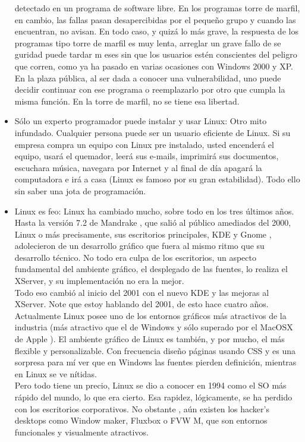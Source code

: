 \documentclass[11pt, a4paper]{report}
\begin{document}
\begin{itemize}
  detectado en un programa de software libre. En los programas torre de marfil,
  en cambio, las fallas pasan desapercibidas por el pequeño grupo y cuando las
  encuentran, no avisan. En todo caso, y quizá lo más grave, la respuesta de
  los programas tipo torre de marfil es muy lenta, arreglar un grave fallo de
  se guridad puede tardar m eses sin que los usuarios estén conscientes del
  peligro que corren, como ya ha pasado en varias ocasiones con Windows 2000 y
  XP. En la plaza pública, al ser dada a conocer una vulnerabilidad, uno puede
  decidir continuar con ese programa o reemplazarlo por otro que cumpla la
  misma función. En la torre de marfil, no se tiene esa libertad.
\item Sólo un experto programador puede instalar y usar Linux: Otro mito
  infundado. Cualquier persona puede ser un usuario eficiente de Linux. Si su
  empresa compra un equipo con Linux pre instalado, usted encenderá el equipo,
  usará el quemador, leerá sus e-mails, imprimirá sus documentos, escuchara
  música, navegara por Internet y al final de día apagará la computadora e irá
  a casa (Linux es famoso por su gran estabilidad). Todo ello sin saber una
  jota de programación.
\item Linux es feo: Linux ha cambiado mucho, sobre todo en los tres últimos
  años. Hasta la versión 7.2 de Mandrake , que salió al público amediados del
  2000, Linux o más precisamente, sus escritorios principales, KDE y Gnome ,
  adolecieron de un desarrollo gráfico que fuera al mismo ritmo que su
  desarrollo técnico. No todo era culpa de los escritorios, un aspecto
  fundamental del ambiente gráfico, el desplegado de las fuentes, lo realiza el
  XServer, y su implementación no era la mejor. \\

  Todo eso cambió al inicio del 2001 con el nuevo KDE y las mejoras al XServer.
  Note que estoy hablando del 2001, de esto hace cuatro años. Actualmente Linux
  posee uno de los entornos gráficos más atractivos de la industria (más
  atractivo que el de Windows y sólo superado por el MacOSX de Apple ). El
  ambiente gráfico de Linux es también, y por mucho, el más flexible y
  personalizable. Con frecuencia diseño páginas usando CSS y es una sorpresa
  para mí ver que en Windows las fuentes pierden definición, mientras en Linux
  se ve nítidas. \\

  Pero todo tiene un precio, Linux se dio a conocer en 1994 como el SO más
  rápido del mundo, lo que era cierto. Esa rapidez, lógicamente, se ha perdido
  con los escritorios corporativos. No obstante , aún existen los hacker's
  desktops como Window maker, Fluxbox o FVW M, que son entornos funcionales y
  visualmente atractivos.

\end{itemize}
\end{document}
